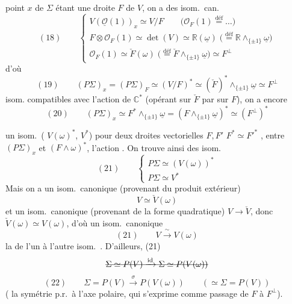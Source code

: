 \documentclass[11pt,a4paper]{article}
\begin{document}
 point $x$ de $\Sigma$ étant une droite $F$ de $V$,
\struck{\ill{}} on a des isom.\ can.
\[
  (18)\qquad
  \begin{cases}
    V(\underline{\mathcal{O}}(1))_x \simeq V/F
      \qquad \bigl(\mathcal{O}_F(1) \overset{\text{déf}}{=} \ldots\bigr) \\
    F \otimes \mathcal{O}_F(1) \simeq \det(V) \simeq
      \mathbb{R}(\underline{\omega})
      \;\bigl(\overset{\text{déf}}{=} \mathbb{R} \wedge_{\{\pm1\}}
      \underline{\omega}\bigr) \\
    \mathcal{O}_F(1) \simeq \check{F}(\omega)
      \;\bigl(\overset{\text{déf}}{=} \check{F} \wedge_{\{\pm1\}}
      \underline{\omega}\bigr) \simeq F^{\perp}
  \end{cases}
\]
d'où
\[
  (19)\qquad (P\Sigma)_x = (P\Sigma)_F \simeq (V/F)^{*} \simeq
  (\check{F})^{*} \wedge_{\{\pm1\}} \underline{\omega} \simeq F^{\perp}
\]
 isom. compatibles avec l'action de
$\mathbb{C}^{*}$ (opérant sur $\check{F}$ par 
  sur $F$), on a encore
\[
  (20)\qquad (P\Sigma)_x \simeq F^{*} \wedge_{\{\pm1\}} \underline{\omega}
  = (F \wedge_{\{\pm1\}} \underline{\omega})^{*} \simeq (F^{\perp})^{*}
\]

\ill{} un isom.\ (\ill{} $V(\omega)^{*}$, $V^{*}$) pour deux droites
vectorielles $F, F'$ \ill{} $F^{*} \simeq F'^{*}$ \ill{}, entre
$(P\Sigma)_x$ et $(F \wedge \omega)^{*}$, 
 l'action \ill{}. On trouve ainsi des isom.
\[
  (21)\qquad
  \begin{cases}
    P\Sigma \simeq (V(\omega))^{*} \\
    P\Sigma \simeq V^{*}
  \end{cases}
\]
Mais on a un isom.\ canonique (provenant du produit extérieur)
\[
  V \simeq \check{V}(\omega)
\]
et un isom.\ canonique (provenant de la forme quadratique)
$V \to \check{V}$, donc $\check{V}(\omega) \simeq V(\omega)$, d'où un
isom.\ canonique
\[
  (21)\qquad V \xrightarrow{\;\sim\;} V(\omega)
\]
 la \ill{} de l'un à l'autre isom.\
. D'ailleurs, (21) 
\[
  \text{\struck{$\Sigma \simeq P(V) \xrightarrow{\text{id}}
  \Sigma \simeq P(V(\omega))$}}
\]
\[
  (22)\qquad \Sigma = P(V) \xrightarrow{\;\sigma\;} P(V(\omega))
  \qquad (\simeq \Sigma = P(V))
\]
( la  symétrie p.r.\ à l'axe polaire,
\struck{qui \ill{}} qui s'exprime \struck{\ill{}} comme \uncertain{le}
passage de $F$ à $F^{\perp}$).
\end{document}
